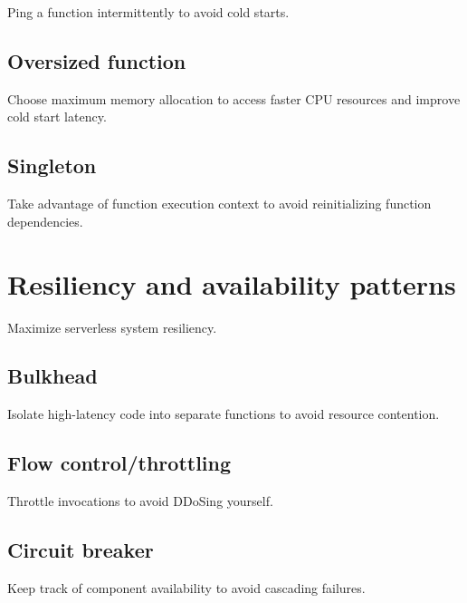 Ping a function intermittently to avoid cold starts.

\subsection{Oversized function} \label{subsubsec:OversizedFunction}

Choose maximum memory allocation to access faster CPU resources and improve cold start latency.

\subsection{Singleton} \label{subsubsec:Singleton}

Take advantage of function execution context to avoid reinitializing function dependencies.

\section{Resiliency and availability patterns} \label{sec:resiliencyPatterns}

Maximize serverless system resiliency.

\subsection{Bulkhead} \label{subsubsec:Bulkhead}

Isolate high-latency code into separate functions to avoid resource contention.

\subsection{Flow control/throttling} \label{subsubsec:Flow control/throttling}

Throttle invocations to avoid DDoSing yourself.

\subsection{Circuit breaker} \label{subsubsec:Circuit breaker}

Keep track of component availability to avoid cascading failures.

